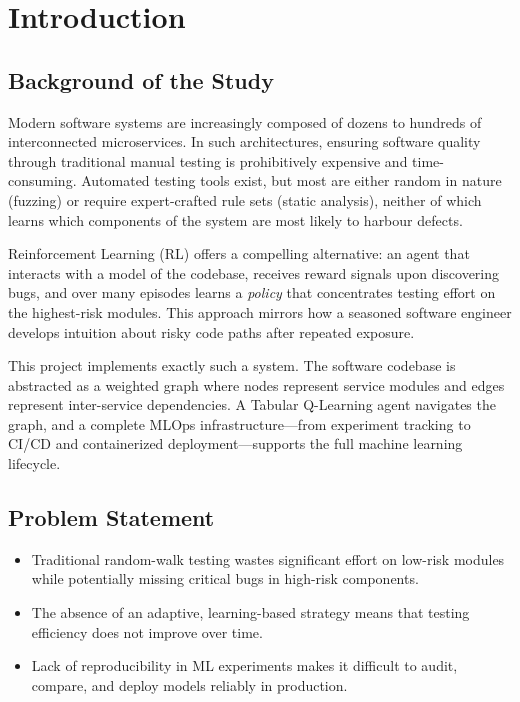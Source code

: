 \documentclass[12pt,a4paper]{report}
\begin{document}
\newpage
{}
\setcounter{page}{1}

\chapter{Introduction}

\section{Background of the Study}

Modern software systems are increasingly composed of dozens to hundreds of
interconnected microservices.  In such architectures, ensuring software
quality through traditional manual testing is prohibitively expensive and
time-consuming.  Automated testing tools exist, but most are either
random in nature (fuzzing) or require expert-crafted rule sets (static
analysis), neither of which learns which components of the system are
most likely to harbour defects.

Reinforcement Learning (RL) offers a compelling alternative: an agent
that interacts with a model of the codebase, receives reward signals upon
discovering bugs, and over many episodes learns a \emph{policy} that
concentrates testing effort on the highest-risk modules.  This approach
mirrors how a seasoned software engineer develops intuition about risky
code paths after repeated exposure.

This project implements exactly such a system.  The software codebase is
abstracted as a weighted graph where nodes represent service modules and
edges represent inter-service dependencies.  A Tabular Q-Learning agent
navigates the graph, and a complete MLOps infrastructure---from experiment
tracking to CI/CD and containerized deployment---supports the full
machine learning lifecycle.

\section{Problem Statement}

\begin{itemize}[leftmargin=1.5em]
  \item Traditional random-walk testing wastes significant effort on
        low-risk modules while potentially missing critical bugs in
        high-risk components.
  \item The absence of an adaptive, learning-based strategy means that
        testing efficiency does not improve over time.
  \item Lack of reproducibility in ML experiments makes it difficult to
        audit, compare, and deploy models reliably in production.
\end{itemize}
\end{document}
